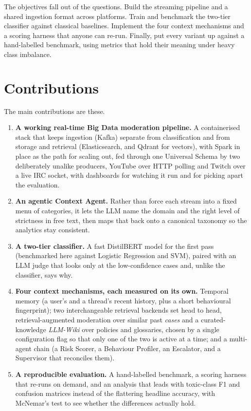 The objectives fall out of the questions. Build the streaming pipeline and a shared ingestion format across platforms. Train and benchmark the two-tier classifier against classical baselines. Implement the four context mechanisms and a scoring harness that anyone can re-run. Finally, put every variant up against a hand-labelled benchmark, using metrics that hold their meaning under heavy class imbalance.

\section{Contributions}\label{contributions}

The main contributions are these.

\begin{enumerate}
\def\labelenumi{\arabic{enumi}.}
\item \textbf{A working real-time Big Data moderation pipeline.} A containerised stack that keeps ingestion (Kafka) separate from classification and from storage and retrieval (Elasticsearch, and Qdrant for vectors), with Spark in place as the path for scaling out, fed through one Universal Schema by two deliberately unalike producers, YouTube over HTTP polling and Twitch over a live IRC socket, with dashboards for watching it run and for picking apart the evaluation.
\item \textbf{An agentic Context Agent.} Rather than force each stream into a fixed menu of categories, it lets the LLM name the domain and the right level of strictness in free text, then maps that back onto a canonical taxonomy so the analytics stay consistent.
\item \textbf{A two-tier classifier.} A fast DistilBERT model for the first pass (benchmarked here against Logistic Regression and SVM), paired with an LLM judge that looks only at the low-confidence cases and, unlike the classifier, says why.
\item \textbf{Four context mechanisms, each measured on its own.} Temporal memory (a user's and a thread's recent history, plus a short behavioural fingerprint); two interchangeable retrieval backends set head to head, retrieval-augmented moderation over similar past \emph{cases} and a curated-knowledge \emph{LLM-Wiki} over policies and glossaries, chosen by a single configuration flag so that only one of the two is active at a time; and a multi-agent chain (a Risk Scorer, a Behaviour Profiler, an Escalator, and a Supervisor that reconciles them).
\item \textbf{A reproducible evaluation.} A hand-labelled benchmark, a scoring harness that re-runs on demand, and an analysis that leads with toxic-class F1 and confusion matrices instead of the flattering headline accuracy, with McNemar's test to see whether the differences actually hold.

\end{enumerate}

